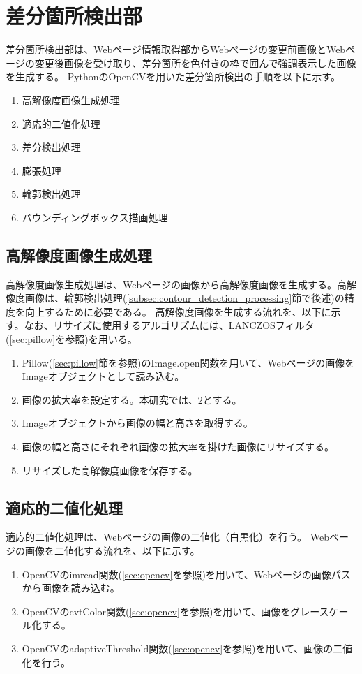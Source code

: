 \section{差分箇所検出部}\label{sec:Difference_extraction_section}
差分箇所検出部は、Webページ情報取得部からWebページの変更前画像とWebページの変更後画像を受け取り、差分箇所を色付きの枠で囲んで強調表示した画像を生成する。
PythonのOpenCV\cite{OpenCV}を用いた差分箇所検出の手順を以下に示す。
\begin{enumerate}
    \item 高解像度画像生成処理
    \item 適応的二値化処理
    \item 差分検出処理
    \item 膨張処理
    \item 輪郭検出処理
    \item バウンディングボックス描画処理
\end{enumerate}

\subsection{高解像度画像生成処理}\label{subsec:Generate_high_images}
高解像度画像生成処理は、Webページの画像から高解像度画像を生成する。高解像度画像は、輪郭検出処理(\ref{subsec:contour_detection_processing}節で後述)の精度を向上するために必要である。
高解像度画像を生成する流れを、以下に示す。なお、リサイズに使用するアルゴリズムには、LANCZOSフィルタ(\ref{sec:pillow}を参照)を用いる。
\begin{enumerate}
    \item Pillow(\ref{sec:pillow}節を参照)のImage.open関数を用いて、Webページの画像をImageオブジェクトとして読み込む。
    \item 画像の拡大率を設定する。本研究では、$2$とする。
    \item Imageオブジェクトから画像の幅と高さを取得する。
    \item 画像の幅と高さにそれぞれ画像の拡大率を掛けた画像にリサイズする。
    \item リサイズした高解像度画像を保存する。
\end{enumerate}

\subsection{適応的二値化処理}\label{subsec:Adaptive_Binarisation}
適応的二値化処理は、Webページの画像の二値化（白黒化）を行う。
Webページの画像を二値化する流れを、以下に示す。
\begin{enumerate}
    \item OpenCVのimread関数(\ref{sec:opencv}を参照)を用いて、Webページの画像パスから画像を読み込む。
    \item OpenCVのcvtColor関数(\ref{sec:opencv}を参照)を用いて、画像をグレースケール化する。
    \item OpenCVのadaptiveThreshold関数(\ref{sec:opencv}を参照)を用いて、画像の二値化を行う。
\end{enumerate}

